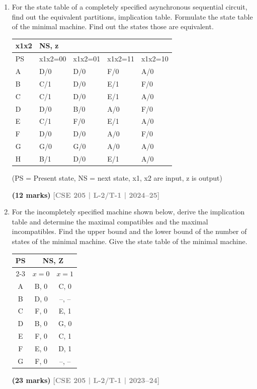 \documentclass[12pt,a4paper]{article}
\newcommand{\yr}[1]{\hfill\textcolor{gray}{\small\textbf{[#1]}}}
\newcommand{\mk}[1]{\textcolor{orange!70!black}{\small\textbf{(#1 marks)}}}
\begin{document}
\begin{enumerate}
\mk{11} \yr{CSE 205 | L-2/T-1 | 2022--23}

\item For the state table of a completely specified asynchronous sequential circuit, find out the equivalent partitions, implication table. Formulate the state table of the minimal machine. Find out the states those are equivalent.

\begin{center}
  \begin{tabular}{|l|l|l|l|l|}
\hline
x1x2 & NS, z & & & \\ \hline
PS & x1x2=00 & x1x2=01 & x1x2=11 & x1x2=10 \\ \hline
A & D/0 & D/0 & F/0 & A/0 \\ \hline
B & C/1 & D/0 & E/1 & F/0 \\ \hline
C & C/1 & D/0 & E/1 & A/0 \\ \hline
D & D/0 & B/0 & A/0 & F/0 \\ \hline
E & C/1 & F/0 & E/1 & A/0 \\ \hline
F & D/0 & D/0 & A/0 & F/0 \\ \hline
G & G/0 & G/0 & A/0 & A/0 \\ \hline
H & B/1 & D/0 & E/1 & A/0 \\ \hline
\end{tabular}

\vspace{0.3cm}
(PS = Present state, NS = next state, x1, x2 are input, z is output)
\end{center}

\mk{12} \yr{CSE 205 | L-2/T-1 | 2024--25}

\item For the incompletely specified machine shown below, derive the implication table and determine the maximal compatibles and the maximal incompatibles. Find the upper bound and the lower bound of the number of states of the minimal machine. Give the state table of the minimal machine.

\begin{center}
\begin{tabular}{|c|c|c|}
\hline
\multirow{2}{*}{PS} & \multicolumn{2}{c|}{NS, Z} \\ \cline{2-3}
 & $x=0$ & $x=1$ \\ \hline
A & B, 0 & C, 0 \\ \hline
B & D, 0 & --, -- \\ \hline
C & F, 0 & E, 1 \\ \hline
D & B, 0 & G, 0 \\ \hline
E & F, 0 & C, 1 \\ \hline
F & E, 0 & D, 1 \\ \hline
G & F, 0 & --, -- \\ \hline
\end{tabular}
\end{center}

\mk{23} \yr{CSE 205 | L-2/T-1 | 2023--24}

\end{enumerate}
\end{document}

